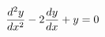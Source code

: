 \documentclass[preview]{standalone}
\begin{document}
\begin{align*}
\special{dvisvgm:raw <g id='unique000'>}\dfrac{d^2y}{dx^2} - 2\dfrac{dy}{dx} + y = 0\special{dvisvgm:raw </g>}
\end{align*}
\end{document}
